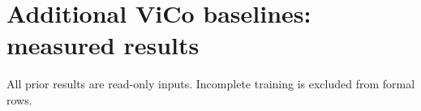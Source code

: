 \documentclass[10pt]{article}
\begin{document}
\section*{Additional ViCo baselines: measured results}
All prior results are read-only inputs. Incomplete training is excluded from formal rows.
\clearpage
\clearpage
\clearpage
\clearpage
\clearpage

\end{document}
